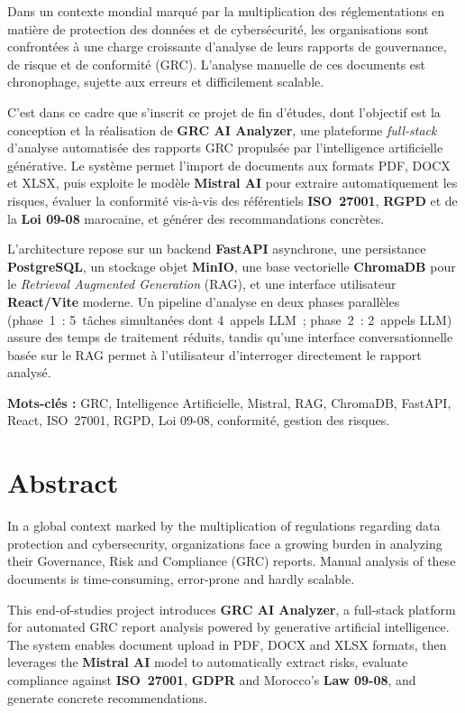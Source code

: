 \documentclass[a4paper,12pt,oneside]{report}
\begin{document}
	Dans un contexte mondial marqu\'e par la multiplication des r\'eglementations en mati\`ere de protection des donn\'ees et de cybers\'ecurit\'e, les organisations sont confront\'ees \`a une charge croissante d'analyse de leurs rapports de gouvernance, de risque et de conformit\'e (GRC). L'analyse manuelle de ces documents est chronophage, sujette aux erreurs et difficilement scalable.
	
	C'est dans ce cadre que s'inscrit ce projet de fin d'\'etudes, dont l'objectif est la conception et la r\'ealisation de \textbf{GRC AI Analyzer}, une plateforme \emph{full-stack} d'analyse automatis\'ee des rapports GRC propuls\'ee par l'intelligence artificielle g\'en\'erative. Le syst\`eme permet l'import de documents aux formats PDF, DOCX et XLSX, puis exploite le mod\`ele \textbf{Mistral AI} pour extraire automatiquement les risques, \'evaluer la conformit\'e vis-\`a-vis des r\'ef\'erentiels \textbf{ISO~27001}, \textbf{RGPD} et de la \textbf{Loi 09-08} marocaine, et g\'en\'erer des recommandations concr\`etes.
	
	L'architecture repose sur un backend \textbf{FastAPI} asynchrone, une persistance \textbf{PostgreSQL}, un stockage objet \textbf{MinIO}, une base vectorielle \textbf{ChromaDB} pour le \emph{Retrieval Augmented Generation} (RAG), et une interface utilisateur \textbf{React/Vite} moderne. Un pipeline d'analyse en deux phases parall\`eles (phase~1~: 5~t\^aches simultan\'ees dont 4~appels LLM~; phase~2~: 2~appels LLM) assure des temps de traitement r\'eduits, tandis qu'une interface conversationnelle bas\'ee sur le RAG permet \`a l'utilisateur d'interroger directement le rapport analys\'e.
	
	\medskip
	\textbf{Mots-cl\'es :} GRC, Intelligence Artificielle, Mistral, RAG, ChromaDB, FastAPI, React, ISO~27001, RGPD, Loi 09-08, conformit\'e, gestion des risques.
	
	\chapter*{Abstract}
	\thispagestyle{plain}
	
	In a global context marked by the multiplication of regulations regarding data protection and cybersecurity, organizations face a growing burden in analyzing their Governance, Risk and Compliance (GRC) reports. Manual analysis of these documents is time-consuming, error-prone and hardly scalable.
	
	This end-of-studies project introduces \textbf{GRC AI Analyzer}, a full-stack platform for automated GRC report analysis powered by generative artificial intelligence. The system enables document upload in PDF, DOCX and XLSX formats, then leverages the \textbf{Mistral AI} model to automatically extract risks, evaluate compliance against \textbf{ISO~27001}, \textbf{GDPR} and Morocco's \textbf{Law 09-08}, and generate concrete recommendations.
	
\end{document}
